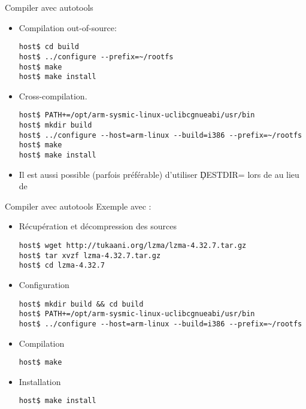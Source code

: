 \begin{frame}[fragile=singleslide]{Compiler avec autotools}
  \begin{itemize}
  \item  Compilation out-of-source:
    \begin{lstlisting}
host$ cd build
host$ ../configure --prefix=~/rootfs
host$ make
host$ make install
    \end{lstlisting} %
  \item  Cross-compilation.
    \begin{lstlisting}
host$ PATH+=/opt/arm-sysmic-linux-uclibcgnueabi/usr/bin
host$ mkdir build
host$ ../configure --host=arm-linux --build=i386 --prefix=~/rootfs
host$ make
host$ make install
    \end{lstlisting} %
  \item  Il   est  aussi  possible   (parfois  préférable)  d'utiliser
    \c{DESTDIR=} lors de  au lieu de 
  \end{itemize}
\end{frame}

\begin{frame}[fragile=singleslide]{Compiler avec autotools}
  Exemple avec :
  \begin{itemize}
  \item Récupération et décompression des sources
\begin{lstlisting}
host$ wget http://tukaani.org/lzma/lzma-4.32.7.tar.gz
host$ tar xvzf lzma-4.32.7.tar.gz
host$ cd lzma-4.32.7
\end{lstlisting} %
  \item Configuration
\begin{lstlisting}
host$ mkdir build && cd build
host$ PATH+=/opt/arm-sysmic-linux-uclibcgnueabi/usr/bin
host$ ../configure --host=arm-linux --build=i386 --prefix=~/rootfs
\end{lstlisting} %
  \item Compilation
\begin{lstlisting}
host$ make
\end{lstlisting} %
  \item Installation
\begin{lstlisting}
host$ make install
\end{lstlisting} %
  \end{itemize}
\end{frame}


